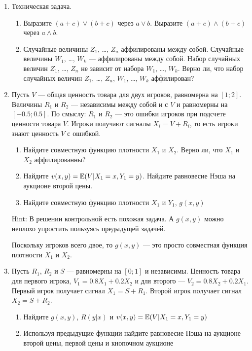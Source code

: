 \begin{enumerate}


\item Техническая задача.
\begin{enumerate}
\item Выразите $ (a+c)\vee (b+c) $ через $ a\vee b $. Выразите $ (a+c)\wedge (b+c) $ через $ a\wedge b $.
\item Случайные величины $ Z_{1} $, \ldots , $ Z_{n} $ аффилированы между собой. Случайные величины $ W_{1} $, \ldots , $ W_{k} $ — аффилированы между собой. Набор случайных величин $ Z_{1} $, \ldots , $ Z_{n} $ не зависит от набора $ W_{1} $, \ldots , $ W_{k} $. Верно ли, что набор случайных величин $ Z_{1} $, \ldots , $ Z_{n} $, $ W_{1} $, \ldots , $ W_{k} $ аффилирован?
\end{enumerate}


\item Пусть $  V $ — общая ценность товара для двух игроков, равномерна на $ [1;2] $. Величины $ R_{1} $ и $ R_{2} $ — независимы между собой и с $ V $ и равномерны на $ [-0.5;0.5] $. По смыслу: $ R_{1} $ и $ R_{2} $ — это ошибки игроков при подсчете ценности товара $ V $. Игроки получают сигналы $ X_{i}=V+R_{i} $, то есть игроки знают ценность  $ V $ с ошибкой.
\begin{enumerate}
\item Найдите совместную функцию плотности $ X_{1} $ и $ X_{2} $. Верно ли, что $ X_{1} $ и $ X_{2} $ аффилированны?
\item Найдите $ v(x,y)=\mathbb{E}(V|X_{1}=x,Y_{1}=y) $. Найдите равновесие Нэша на аукционе второй цены.
\item Найдите совместную функцию плотности $ X_{1} $ и $ Y_{1} $, $ g(x,y) $
\end{enumerate}

Hint: В решении контрольной есть похожая задача. А $ g(x,y) $ можно неплохо упростить пользуясь предыдущей задачей.

Поскольку игроков всего двое, то $ g(x,y)$ — это просто совместная функция плотности $ X_{1} $ и $ X_{2} $.


\item Пусть $ R_{1} $, $ R_{2} $ и $ S $ — равномерны на $ [0;1] $ и независимы. Ценность товара для первого игрока, $ V_{1}=0.8X_{1}+0.2X_{2} $ и для второго — $ V_{2}=0.8X_{2}+0.2X_{1} $. Первый игрок получает сигнал $ X_{1}=S+R_{1} $. Второй игрок получает сигнал $ X_{2}=S+R_{2} $.
\begin{enumerate}
\item Найдите $ g(x,y) $, $ R(y|x) $ и $ v(x,y)=\mathbb{E}(V|X_{1}=x,Y_{1}=y) $
\item Используя предыдущие функции найдите равновесие Нэша на аукционе второй цены, первой цены и кнопочном аукционе
\end{enumerate}


\end{enumerate}
